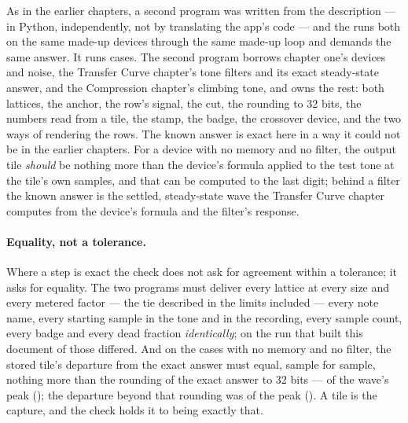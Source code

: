 \documentclass[11pt,a4paper]{article}
\begin{document}
As in the earlier chapters, a second program was written from the
description --- in Python, independently, not by translating the app's
code --- and the  runs both on the same made-up devices
through the same made-up loop and demands the same answer. It runs
\mparityCaseCount{} cases. The second program borrows chapter one's
devices and noise, the Transfer Curve chapter's tone filters and its
exact steady-state answer, and the Compression chapter's climbing tone,
and owns the rest: both lattices, the anchor, the row's signal, the cut,
the rounding to 32 bits, the numbers read from a tile, the stamp, the
badge, the crossover device, and the two ways of rendering the rows. The
known answer is exact here in a way it could not be in the earlier
chapters. For a device with no memory and no filter, the output tile
\emph{should} be nothing more than the device's formula applied to the
test tone at the tile's own samples, and that can be computed to the last
digit; behind a filter the known answer is the settled, steady-state wave
the Transfer Curve chapter computes from the device's formula and the
filter's response.

\paragraph{Equality, not a tolerance.} Where a step is exact the check
does not ask for agreement within a tolerance; it asks for equality. The
two programs must deliver every lattice at every size and every metered
factor --- the tie described in the limits included --- every note name,
every starting sample in the tone and in the recording, every sample
count, every badge and every dead fraction \emph{identically}; on the run
that built this document \mparityWorstExact{} of those differed. And on
the \mparityMemorylessCount{} cases with no memory and no filter, the
stored tile's departure from the exact answer must equal, sample for
sample, nothing more than the rounding of the exact answer to 32 bits ---
\mparityQuantizationWords{} of the wave's peak
(\mparityQuantization); the departure beyond that rounding was
\mparityMemorylessBeyondWords{} of the peak (\mparityMemorylessBeyond). A
tile is the capture, and the check holds it to being exactly that.
\end{document}
